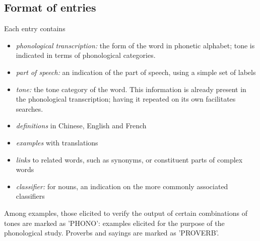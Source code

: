 \documentclass[oldfontcommands,oneside,a4paper,11pt]{article}
\begin{document}
	\subsection{Format of entries} \label{sec:entries}
	
	Each entry contains
	\begin{itemize}
		\item \textit{phonological transcription:} the form of the word in phonetic alphabet; tone is indicated in terms of phonological categories. 
		\item \textit{part of speech:} an indication of the part of speech, using a simple set of labels
		\item \textit{tone:} the tone category of the word. This information is already present in the phonological transcription; having it repeated on its own facilitates searches.
		\item \textit{definitions} in Chinese, English and French
		\item \textit{examples} with translations
		\item \textit{links} to related words, such as synonyms, or constituent parts of complex words 
		\item \textit{classifier:} for nouns, an indication on the more commonly associated classifiers
	\end{itemize}
	
	Among examples, those elicited to verify the output of certain combinations of tones are marked as 'PHONO': examples elicited for the purpose of the phonological study. Proverbs and sayings are marked as 'PROVERB'.
	
\end{document}
